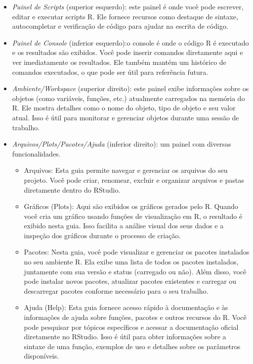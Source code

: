 \documentclass[
  letterpaper,
  DIV=11,
  numbers=noendperiod]{scrreprt}
\begin{document}
\begin{itemize}
\item
  \emph{Painel de Scripts} (superior esquerdo): este painel é onde você
  pode escrever, editar e executar scripts R. Ele fornece recursos como
  destaque de sintaxe, autocompletar e verificação de código para ajudar
  na escrita de código.
\item
  \emph{Painel de Console} (inferior esquerdo):o console é onde o código
  R é executado e os resultados são exibidos. Você pode inserir comandos
  diretamente aqui e ver imediatamente os resultados. Ele também mantém
  um histórico de comandos executados, o que pode ser útil para
  referência futura.
\item
  \emph{Ambiente/Workspace} (superior direito): este painel exibe
  informações sobre os objetos (como variáveis, funções, etc.)
  atualmente carregados na memória do R. Ele mostra detalhes como o nome
  do objeto, tipo de objeto e seu valor atual. Isso é útil para
  monitorar e gerenciar objetos durante uma sessão de trabalho.
\item
  \emph{Arquivos/Plots/Pacotes/Ajuda} (inferior direito): um painel com
  diversas funcionalidades.

  \begin{itemize}
  \item
    Arquivos: Esta guia permite navegar e gerenciar os arquivos do seu
    projeto. Você pode criar, renomear, excluir e organizar arquivos e
    pastas diretamente dentro do RStudio.
  \item
    Gráficos (Plots): Aqui são exibidos os gráficos gerados pelo R.
    Quando você cria um gráfico usando funções de visualização em R, o
    resultado é exibido nesta guia. Isso facilita a análise visual dos
    seus dados e a inspeção dos gráficos durante o processo de criação.
  \item
    Pacotes: Nesta guia, você pode visualizar e gerenciar os pacotes
    instalados no seu ambiente R. Ela exibe uma lista de todos os
    pacotes instalados, juntamente com sua versão e status (carregado ou
    não). Além disso, você pode instalar novos pacotes, atualizar
    pacotes existentes e carregar ou descarregar pacotes conforme
    necessário para o seu trabalho.
  \item
    Ajuda (Help): Esta guia fornece acesso rápido à documentação e às
    informações de ajuda sobre funções, pacotes e outros recursos do R.
    Você pode pesquisar por tópicos específicos e acessar a documentação
    oficial diretamente no RStudio. Isso é útil para obter informações
    sobre a sintaxe de uma função, exemplos de uso e detalhes sobre os
    parâmetros disponíveis.
  \end{itemize}
\end{itemize}
\end{document}
